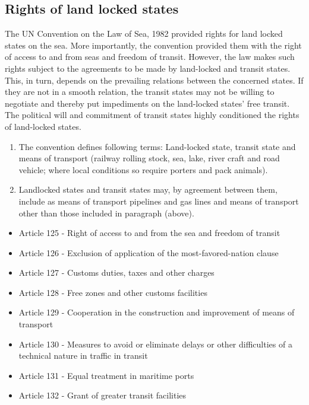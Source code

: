\documentclass[
  openany]{book}
\providecommand{\tightlist}{%
  \setlength{\itemsep}{0pt}\setlength{\parskip}{0pt}}
\begin{document}
\hypertarget{rights-of-land-locked-states}{%
\subsection{Rights of land locked states}\label{rights-of-land-locked-states}}

The UN Convention on the Law of Sea, 1982 provided rights for land locked states on the sea. More importantly, the convention provided them with the right of access to and from seas and freedom of transit. However, the law makes such rights subject to the agreements to be made by land-locked and transit states. This, in turn, depends on the prevailing relations between the concerned states. If they are not in a smooth relation, the transit states may not be willing to negotiate and thereby put impediments on the land-locked states' free transit. The political will and commitment of transit states highly conditioned the rights of land-locked states.

\begin{enumerate}
\def\labelenumi{\arabic{enumi}.}
\tightlist
\item
  The convention defines following terms: Land-locked state, transit state and means of transport (railway rolling stock, sea, lake, river craft and road vehicle; where local conditions so require porters and pack animals).
\item
  Landlocked states and transit states may, by agreement between them, include as means of transport pipelines and gas lines and means of transport other than those included in paragraph (above).
\end{enumerate}

\begin{itemize}
\tightlist
\item
  Article 125 - Right of access to and from the sea and freedom of transit
\item
  Article 126 - Exclusion of application of the most-favored-nation clause
\item
  Article 127 - Customs duties, taxes and other charges
\item
  Article 128 - Free zones and other customs facilities
\item
  Article 129 - Cooperation in the construction and improvement of means of transport
\item
  Article 130 - Measures to avoid or eliminate delays or other difficulties of a technical nature in traffic in transit
\item
  Article 131 - Equal treatment in maritime ports
\item
  Article 132 - Grant of greater transit facilities
\end{itemize}
\end{document}
